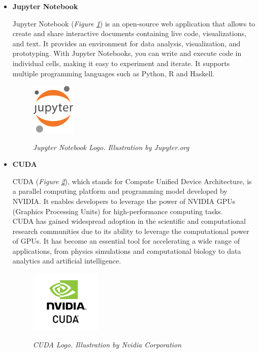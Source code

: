 \begin{itemize}
  \item \textbf{Jupyter Notebook}

    Jupyter Notebook (\textit{Figure \ref{fig:jupyter-logo}}) is an open-source
    web application that allows to create and share interactive documents
    containing live code, visualizations, and text. It provides an environment
    for data analysis, visualization, and prototyping. With Jupyter Notebooks,
    you can write and execute code in individual cells, making it easy to
    experiment and iterate. It supports multiple programming languages such as
    Python, R and Haskell.

    \begin{figure}[H]
      \centering
      \includegraphics[width=0.2\textwidth]{imatges/studies_and_decisions/jupyter-notebook.png}
      \caption[Jupyter Notebook Logo]{\textit{Jupyter Notebook Logo. Illustration by Jupyter.org}}
      {\label{fig:jupyter-logo}}
    \end{figure}

    \newpage

  \item \textbf{CUDA}

    CUDA (\textit{Figure \ref{fig:cuda-logo}}), which stands for Compute
    Unified Device Architecture, is a parallel computing platform and
    programming model developed by NVIDIA. It enables developers to leverage
    the power of NVIDIA GPUs (Graphics Processing Units) for high-performance
    computing tasks. \\

    CUDA has gained widespread adoption in the scientific and computational
    research communities due to its ability to leverage the computational power
    of GPUs. It has become an essential tool for accelerating a wide range of
    applications, from physics simulations and computational biology to data
    analytics and artificial intelligence.

    \begin{figure}[H]
      \centering
      \begin{adjustbox}{trim=0cm 0.25cm 0cm 0.5cm, clip}
        \includegraphics[width=0.325\textwidth]{imatges/studies_and_decisions/nvidia-cuda.jpg}
      \end{adjustbox}
      \caption[CUDA Logo]{\textit{CUDA Logo. Illustration by Nvidia Corporation}}
      {\label{fig:cuda-logo}}
    \end{figure}


\end{itemize}
